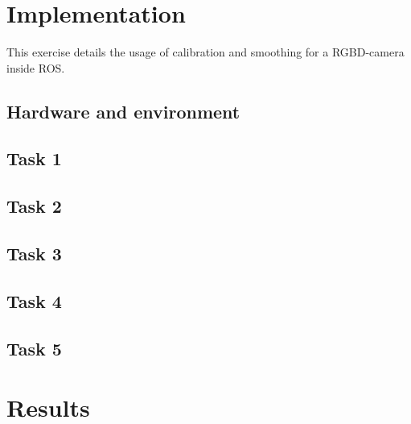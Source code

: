 \documentclass[11pt]{article}
\begin{document}
\section{Implementation}
This exercise details the usage of calibration and smoothing for a RGBD-camera inside ROS.
\subsection{Hardware and environment}
\subsection{Task 1}
\subsection{Task 2}
\subsection{Task 3}
\subsection{Task 4}
\subsection{Task 5}

\section{Results}


\end{document}
